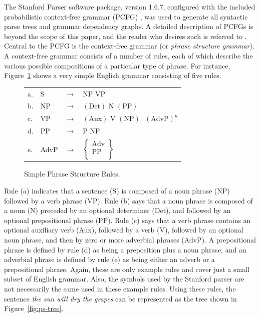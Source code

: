 \documentclass[main.tex]{subfiles}
\begin{document}
The Stanford Parser software package, version 1.6.7, configured with the included probabilistic context-free grammar (PCFG) \citep*{klein-manning-pcfg:2003}, was used to generate all syntactic parse trees and grammar dependency graphs. A detailed description of PCFGs is beyond the scope of this paper, and the reader who desires such is referred to \citet{booth:1973}. Central to the PCFG is the context-free grammar (or \textit{phrase structure grammar}). A context-free grammar consists of a number of rules, each of which describe the various possible compositions of a particular type of phrase. For instance, Figure~\ref{fig:ps-rules} shows a very simple English grammar consisting of five rules.
\begin{figure}
\centering
\begin{tabular}{l l l l}
a. & S & $\rightarrow$ & $\text{NP} \text{ VP}$\\ 
b. & NP & $\rightarrow$ & $(\text{Det}) \text{ N } (\text{PP})$\\
c. & VP & $\rightarrow$ & $(\text{Aux}) \text{ V } (\text{NP}) \text{ } (\text{AdvP})^n$\\
d. & PP & $\rightarrow$ & $\text{P } \text{NP}$\\
e. & AdvP &  $\rightarrow$ & $\begin{Bmatrix}
\text{Adv} \\ \text{PP} \\
\end{Bmatrix} $
\end{tabular}
\caption{Simple Phrase Structure Rules. \citep[Ch. 5.3]{akmajian:2010}}
\label{fig:ps-rules}
\end{figure}
Rule (a) indicates that a sentence (S) is composed of a noun phrase (NP) followed by a verb phrase (VP). Rule (b) says that a noun phrase is composed of a noun (N) preceded by an optional determiner (Det), and followed by an optional prepositional phrase (PP). Rule (c) says that a verb phrase contains an optional auxiliary verb (Aux), followed by a verb (V), followed by an optional noun phrase, and then by zero or more adverbial phrases (AdvP). A prepositional phrase is defined by rule (d) as being a preposition plus a noun phrase, and an adverbial phrase is defined by rule (e) as being either an adverb or a prepositional phrase. Again, these are only example rules and cover just a small subset of English grammar. Also, the symbols used by the Stanford parser are not necessarily the same used in these example rules. Using these rules, the sentence \textit{the sun will dry the grapes} can be represented as the tree shown in Figure~\ref{fig:ps-tree}.
\end{document}

